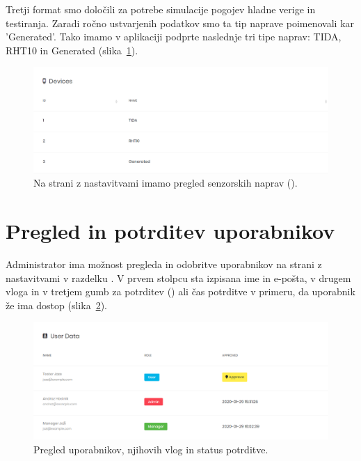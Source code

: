 \documentclass[a4paper, 12pt]{book}
\begin{document}
Tretji format smo določili za potrebe simulacije pogojev hladne verige in testiranja. Zaradi ročno ustvarjenih podatkov smo ta tip naprave poimenovali kar 'Generated'.
Tako imamo v aplikaciji podprte naslednje tri tipe naprav: TIDA, RHT10 in Generated (slika~\ref{ss-settings-devices}).

\begin{figure}[h]
\begin{center}
\includegraphics[width=\textwidth]{slike/devices.png}
\end{center}
\caption{Na strani z nastavitvami imamo pregled senzorskih naprav ().}
\label{ss-settings-devices}
\end{figure}

\newpage

\section{Pregled in potrditev uporabnikov}

Administrator ima možnost pregleda in odobritve uporabnikov na strani z nastavitvami v razdelku . V prvem stolpcu sta izpisana ime in e-pošta, v drugem vloga in v tretjem gumb za potrditev () ali čas potrditve v primeru, da uporabnik že ima dostop (slika~\ref{ss-settings-users}).

\begin{figure}[h]
\begin{center}
\includegraphics[width=\textwidth]{slike/users.png}
\end{center}
\caption{Pregled uporabnikov, njihovih vlog in status potrditve.}
\label{ss-settings-users}
\end{figure}
\end{document}
